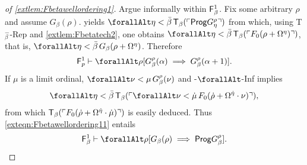 \documentclass[UKenglish,cleveref,DIV=12]{scrartcl}
\let\forall\forallAlt
\theoremstyle{definition}
\theoremstyle{definition}
\begin{document}
\begin{proof}[of \cref{extlem:Fbetawellordering1}]
Argue informally within $\mathsf{F}_\beta^1$. Fix some arbitrary $\rho$ and assume $G_\beta(\rho)$.
 yields $\forall\eta<\bar\beta\,\T_\beta(\gn{\Prog
G_\eta^\rho})$ from which, using T$^-_\beta$-Rep and \cref{extlem:Fbetatech2},
one obtains
  $\forall\eta<\bar\beta\,\T_\beta(\gn{F_0(\rho+\Omega^\eta)})$,
that is, $\forall\eta<\bar\beta\,G_\beta(\rho+\Omega^\eta)$. Therefore
\begin{align}\label{exteqn:Fbetawellordering11}
 \F_p^1\proves\forall\rho[G_\beta^\rho(\alpha)\implies G_\beta^\rho(\alpha+1)].
\end{align}
If $\mu$ is a limit ordinal, $\forall\nu<\mu\,G_\beta^\rho(\nu)$ and
\textT\beta-$\forall$-Inf implies
\begin{align*}
\forall\eta<\bar\beta\,\T_\beta(\gn{\forall\nu<\dot\mu\,F_0(\dot\rho+\Omega^{\dot\eta}
\cdot\nu)}),
\end{align*}
from which $\mathsf{T}_\beta(\ulcorner{F_0(\dot\rho+\Omega^{\dot\eta}\cdot\dot\mu)}\urcorner)$ is easily
deduced. Thus \cref{exteqn:Fbetawellordering11} entails
\begin{align*}
 \F_\beta^1\proves\forall\rho[G_\beta(\rho)\implies \Prog G_\beta^\rho].
\end{align*}


\end{proof}
\end{document}
